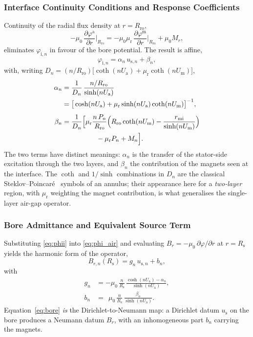 \documentclass[10pt,a4paper,twocolumn]{article}
\newcommand{\Rs}{R_{\mathrm{s}}}
\newcommand{\Rro}{R_{\mathrm{ro}}}
\newcommand{\rmi}{r_{\mathrm{mi}}}
\newcommand{\murec}{\mu_{\mathrm{r}}}
\newcommand{\Ua}{U_{\mathrm{a}}}
\newcommand{\Um}{U_{\mathrm{m}}}
\theoremstyle{plain}
\theoremstyle{remark}
\begin{document}
\subsubsection{Interface Continuity Conditions and Response Coefficients}

Continuity of the radial flux density at $r=\Rro$,
\begin{equation}
-\mu_0\,\frac{\partial\varphi^{\mathrm{a}}}{\partial r}\bigg|_{\Rro}
= -\mu_0\murec\,\frac{\partial\varphi^{\mathrm{m}}}{\partial r}\bigg|_{\Rro}
+ \mu_0 M_r ,
\label{eq:continuity}
\end{equation}
eliminates $\varphi_{\mathrm{i},n}$ in favour of the bore potential. The
result is affine,
\begin{equation}
\varphi_{\mathrm{i},n} = \alpha_n\,u_{\mathrm{s},n} + \beta_n ,
\label{eq:phii}
\end{equation}
with, writing $D_n = (n/\Rro)\big[\coth(n\Ua)+\murec\coth(n\Um)\big]$,
\begin{align}
\alpha_n &= \frac{1}{D_n}\,\frac{n/\Rro}{\sinh(n\Ua)}\notag\\
 &= \big[\cosh(n\Ua)+\murec\sinh(n\Ua)\coth(n\Um)\big]^{-1},
\label{eq:alpha}\\[1ex]
\beta_n &= \frac{1}{D_n}\Bigl[\murec\frac{n\,P_n}{\Rro}
 \Bigl(\Rro\coth(n\Um)-\frac{\rmi}{\sinh(n\Um)}\Bigr)\notag\\
 &\qquad\qquad\quad -\murec P_n + M_n\Bigr].
\label{eq:beta}
\end{align}
The two terms have distinct meanings: $\alpha_n$ is the transfer of the
stator-side excitation through the two layers, and $\beta_n$ the
contribution of the magnets seen at the interface. The $\coth$ and
$1/\sinh$ combinations in $D_n$ are the classical Steklov--Poincar\'e~\cite{quarteroni1999}
symbols of an annulus; their appearance here for a \emph{two-layer}
region, with $\murec$ weighting the magnet contribution, is what
generalises the single-layer air-gap operator.

\subsubsection{Bore Admittance and Equivalent Source Term}

Substituting \eqref{eq:phii} into \eqref{eq:phi_air} and evaluating
$B_r = -\mu_0\,\partial\varphi/\partial r$ at $r=\Rs$ yields the
harmonic form of the operator,
\begin{equation}
B_{r,n}(\Rs) = g_n\,u_{\mathrm{s},n} + b_n ,
\label{eq:bore}
\end{equation}
with
\begin{equation}
\begin{aligned}
g_n &= -\mu_0\,\frac{n}{\Rs}\,
       \frac{\cosh(n\Ua)-\alpha_n}{\sinh(n\Ua)} ,\\[1ex]
b_n &= \ \ \mu_0\,\frac{n}{\Rs}\,\frac{\beta_n}{\sinh(n\Ua)} .
\end{aligned}
\label{eq:gnbn}
\end{equation}
Equation~\eqref{eq:bore} \emph{is} the Dirichlet-to-Neumann map: a
Dirichlet datum $u_{\mathrm{s}}$ on the bore produces a Neumann datum
$B_r$, with an inhomogeneous part $b_n$ carrying the magnets.
\end{document}
